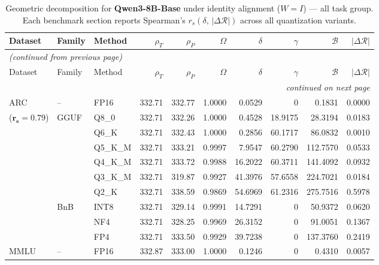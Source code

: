 \begingroup
\small
\setlength{\tabcolsep}{4pt}
\renewcommand{\arraystretch}{1.05}
\setlength{\LTcapwidth}{\textwidth}
\begin{longtable}{ll l rrrrrrr}
\caption{Geometric decomposition for \textbf{Qwen3-8B-Base} under identity alignment ($W{=}I$) --- all task group. Each benchmark section reports Spearman's $r_s(\delta,\,|\Delta\mathcal{R}|)$ across all quantization variants.}\label{tab:qwen_decomposition_all}\\
\toprule
Dataset & Family & Method & $\rho_T$ & $\rho_P$ & $\Omega$ & $\delta$ & $\gamma$ & $\mathcal{B}$ & $|\Delta\mathcal{R}|$ \\
\midrule
\endfirsthead
\multicolumn{10}{l}{\small\itshape (continued from previous page)}\\
\toprule
Dataset & Family & Method & $\rho_T$ & $\rho_P$ & $\Omega$ & $\delta$ & $\gamma$ & $\mathcal{B}$ & $|\Delta\mathcal{R}|$ \\
\midrule
\endhead
\midrule
\multicolumn{10}{r}{\small\itshape continued on next page}\\
\endfoot
\bottomrule
\endlastfoot
ARC & -- & FP16 & 332.71 & 332.77 & 1.0000 & 0.0529 & \cellcolor{cyan!12} $0$ & 0.1831 & 0.0000 \\
{\small ($\mathbf{r_s{=}0.79}$)} & GGUF & Q8\_0 & 332.71 & 332.26 & 1.0000 & 0.4528 & 18.9175 & 28.3194 & 0.0183 \\
 &  & Q6\_K & 332.71 & 332.43 & 1.0000 & 0.2856 & 60.1717 & 86.0832 & 0.0010 \\
 &  & Q5\_K\_M & 332.71 & 333.21 & 0.9997 & 7.9547 & 60.2790 & 112.7570 & 0.0533 \\
 &  & Q4\_K\_M & 332.71 & 333.72 & 0.9988 & 16.2022 & 60.3711 & 141.4092 & 0.0932 \\
 &  & Q3\_K\_M & 332.71 & 319.87 & 0.9927 & 41.3976 & 57.6558 & 224.7021 & 0.0184 \\
 &  & Q2\_K & 332.71 & 338.59 & 0.9869 & 54.6969 & 61.2316 & 275.7516 & 0.5978 \\
 & BnB & INT8 & 332.71 & 329.14 & 0.9991 & 14.7291 & \cellcolor{cyan!12} $0$ & 50.9372 & 0.0620 \\
 &  & NF4 & 332.71 & 328.25 & 0.9969 & 26.3152 & \cellcolor{cyan!12} $0$ & 91.0051 & 0.1367 \\
 &  & FP4 & 332.71 & 333.50 & 0.9929 & 39.7238 & \cellcolor{cyan!12} $0$ & 137.3760 & 0.2419 \\
\midrule
MMLU & -- & FP16 & 332.87 & 333.00 & 1.0000 & 0.1246 & \cellcolor{cyan!12} $0$ & 0.4310 & 0.0057 \\

\end{longtable}
